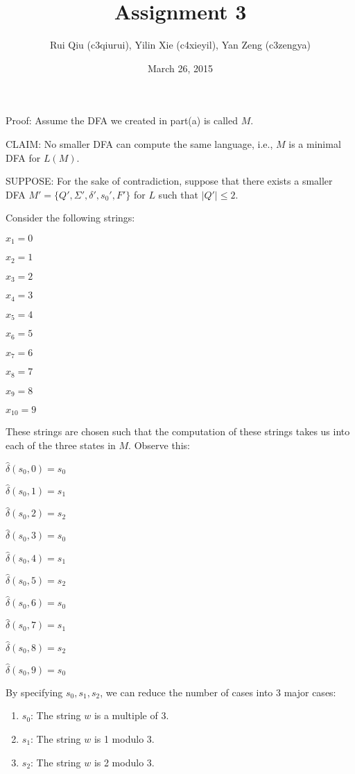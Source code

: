 \documentclass{article}
\title{Assignment 3}
\author{Rui Qiu (c3qiurui), Yilin Xie (c4xieyil), Yan Zeng (c3zengya)}
\date{March 26, 2015}
\begin{document}
\maketitle

Proof: Assume the DFA we created in part(a) is called $M$.

CLAIM:  No smaller DFA can compute the same language, i.e., $M$ is a minimal DFA for $L(M)$.

SUPPOSE: For the sake of contradiction, suppose that there exists a smaller DFA $M'=\{Q', \Sigma', \delta', s_0', F'\}$ for $L$ such that $|Q'| \leqslant 2$.

Consider the following strings:

\begin{center}
$x_1 = 0$

$x_2 = 1$

$x_3 = 2$

$x_4 = 3$

$x_5 = 4$

$x_6 = 5$

$x_7 = 6$

$x_8 = 7$

$x_9 = 8$

$x_{10} = 9$
\end{center}

These strings are chosen such that the computation of these strings takes us into each of the three states in $M$. Observe this:

\begin{center}
$\hat{\delta}(s_0, 0) = s_0$

$\hat{\delta}(s_0, 1) = s_1$

$\hat{\delta}(s_0, 2) = s_2$

$\hat{\delta}(s_0, 3) = s_0$

$\hat{\delta}(s_0, 4) = s_1$

$\hat{\delta}(s_0, 5) = s_2$

$\hat{\delta}(s_0, 6) = s_0$

$\hat{\delta}(s_0, 7) = s_1$

$\hat{\delta}(s_0, 8) = s_2$

$\hat{\delta}(s_0, 9) = s_0$
\end{center}

By specifying $s_0, s_1, s_2$, we can reduce the number of cases into 3 major cases:
\begin{enumerate}
\item $s_0$: The string $w$ is a multiple of 3.
\item $s_1$: The string $w$ is 1 modulo 3.
\item $s_2$: The string $w$ is 2 modulo 3.
\end{enumerate}
\end{document}
